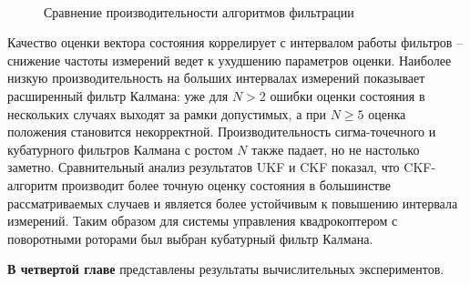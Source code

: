 \begin{figure}[H]
	\begin{minipage}[h]{0.49\linewidth}
	\end{minipage}
	\hfill
	\begin{minipage}[h]{0.49\linewidth}
	\end{minipage}
	\\
	\begin{minipage}[h]{0.49\linewidth}
	\end{minipage}
	\hfill
	\begin{minipage}[h]{0.49\linewidth}
	\end{minipage}
	\caption{Сравнение производительности алгоритмов фильтрации}
	\label{fig:est_cmpr}
\end{figure}

Качество оценки вектора состояния коррелирует с интервалом работы фильтров --
снижение частоты измерений  ведет к ухудшению параметров оценки.
Наиболее низкую производительность на больших интервалах измерений показывает расширенный фильтр Калмана:
уже для $N>2$ ошибки оценки состояния в нескольких случаях выходят за рамки допустимых,
а при $N \geq 5$ оценка положения становится некорректной.
Производительность сигма-точечного и кубатурного фильтров Калмана с ростом $N$ также падает,
но не настолько заметно.
Сравнительный анализ результатов UKF и CKF показал, что CKF-алгоритм производит более точную оценку состояния
в большинстве рассматриваемых случаев и является более устойчивым к повышению интервала измерений.
Таким образом для системы управления квадрокоптером с поворотными роторами был выбран кубатурный фильтр Калмана.

\textbf{В четвертой главе} представлены результаты вычислительных экспериментов. 

